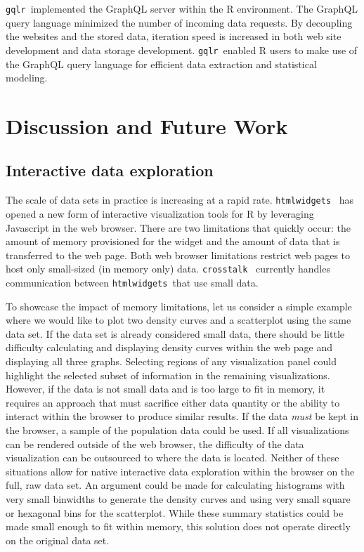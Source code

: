 \documentclass[stat,dissertation]{puthesis}\usepackage[]{graphicx}\usepackage{xcolor}
\newcommand{\pkg}[1]{\texttt{#1}}
\newcommand{\gqlr}{\pkg{gqlr}}
\begin{document}
\gqlr~implemented the GraphQL server within the R environment.  The GraphQL query language minimized the number of incoming data requests.  By decoupling the websites and the stored data, iteration speed is increased in both web site development and data storage development.  \gqlr~enabled R users to make use of the GraphQL query language for efficient data extraction and statistical modeling.

\section{Discussion and Future Work}

\subsection{Interactive data exploration}

The scale of data sets in practice is increasing at a rapid rate.  \pkg{htmlwidgets}~\cite{r_htmlwidgets} has opened a new form of interactive visualization tools for R by leveraging Javascript in the web browser.  There are two limitations that quickly occur: the amount of memory provisioned for the widget and the amount of data that is transferred to the web page.  Both web browser limitations restrict web pages to host only small-sized (in memory only) data. \pkg{crosstalk}~\cite{r_crosstalk} currently handles communication between \pkg{htmlwidgets}~that use small data.

To showcase the impact of memory limitations, let us consider a simple example where we would like to plot two density curves and a scatterplot using the same data set.  If the data set is already considered small data, there should be little difficulty calculating and displaying density curves within the web page and displaying all three graphs.  Selecting regions of any visualization panel could highlight the selected subset of information in the remaining visualizations.  However, if the data is not small data and is too large to fit in memory, it requires an approach that must sacrifice either data quantity or the ability to interact within the browser to produce similar results.  If the data \emph{must} be kept in the browser, a sample of the population data could be used.  If all visualizations can be rendered outside of the web browser, the difficulty of the data visualization can be outsourced to where the data is located.  Neither of these situations allow for native interactive data exploration within the browser on the full, raw data set.  An argument could be made for calculating histograms with very small binwidths to generate the density curves and using very small square or hexagonal bins for the scatterplot.  While these summary statistics could be made small enough to fit within memory, this solution does not operate directly on the original data set.
\end{document}
